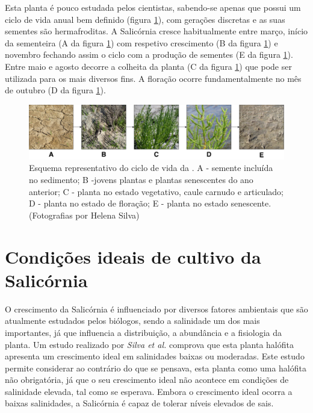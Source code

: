 Esta planta é pouco estudada pelos cientistas\cite{Figueroa1987}, sabendo-se apenas que possui um ciclo de vida anual bem definido (figura \ref{ciclodevida}), com gerações discretas e as suas sementes são hermafroditas\cite{Silva2007}. A Salicórnia cresce habitualmente entre março, início da sementeira (A da figura \ref{ciclodevida}) com respetivo crescimento (B da figura \ref{ciclodevida}) e novembro fechando assim o ciclo com a produção de sementes (E da figura \ref{ciclodevida}). Entre maio  e agosto decorre a colheita da planta\cite{RaquelPinto} (C da figura \ref{ciclodevida}) que pode ser utilizada para os mais diversos fins. A floração ocorre fundamentalmente no mês de outubro\cite{Figueroa1987} (D da figura \ref{ciclodevida}). 

\begin{figure}[!htb]
	\centering
	\includegraphics[width=\linewidth]{img/cap2-sali/ciclo/ciclodevida.pdf}
	\caption[Esquema representativo do ciclo de vida da \sr.]{Esquema representativo do ciclo de vida da \sr. A - semente incluída no sedimento; B -jovens plantas e plantas senescentes do ano anterior; C - planta no estado vegetativo, caule carnudo e articulado; D - planta no estado de floração; E - planta no estado senescente. (Fotografias por Helena Silva)}
	\label{ciclodevida}
\end{figure}

\section{Condições ideais de cultivo da Salicórnia}

O crescimento da Salicórnia é influenciado por diversos fatores ambientais que são atualmente estudados pelos biólogos, sendo a salinidade um dos mais importantes, já que influencia a distribuição, a abundância e a fisiologia da planta. Um estudo realizado por \textit{Silva et al.}\cite{Silva2007} comprova que esta planta halófita apresenta um crescimento ideal em salinidades baixas ou moderadas. Este estudo permite considerar ao contrário do que se pensava, esta planta como uma halófita não obrigatória, já que o seu crescimento ideal não acontece em condições de salinidade elevada, tal como se esperava. Embora o crescimento ideal ocorra a baixas salinidades, a Salicórnia é capaz de tolerar níveis elevados de sais\cite{Rubio-Casal2003}.

